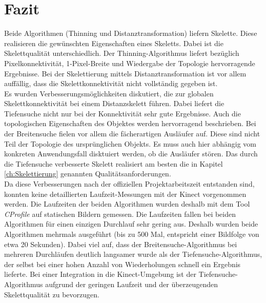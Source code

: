 \section{Fazit}
Beide Algorithmen (Thinning und Distanztransformation) liefern 
Skelette. Diese realisieren die gewünschten Eigenschaften eines
Skeletts. Dabei ist die Skelettqualität unterschiedlich. Der
Thinning-Algorithmus liefert bezüglich Pixelkonnektivität, 
1-Pixel-Breite und Wiedergabe der Topologie hervorragende Ergebnisse. Bei der Skelettierung mittels Distanztransformation
ist vor allem auffällig, dass die Skelettkonnektivität nicht vollständig gegeben ist. \\
Es wurden Verbesserungsmöglichkeiten diskutiert, die zur globalen Skelettkonnektivität bei einem Distanzskelett führen. Dabei
liefert die Tiefensuche nicht nur bei der Konnektivität sehr gute Ergebnisse. Auch die topologischen Eigenschaften des Objektes werden
hervorragend beschrieben. Bei der Breitensuche fielen vor allem die fächerartigen Ausläufer auf. Diese sind nicht Teil der Topologie
des ursprünglichen Objekts. Es muss auch hier abhängig vom konkreten Anwendungsfall disktuiert werden, ob die Ausläufer stören. Das durch die Tiefensuche verbesserte Skelett realisiert am besten die in Kapitel \ref{ch:Skelettierung} genannten Qualitätsanforderungen.\\ Da diese Verbesserungen nach der offiziellen Projektarbeitszeit entstanden sind, konnten keine detaillierten Laufzeit-Messungen mit der Kinect vorgenommen werden. Die Laufzeiten
der beiden Algorithmen wurden deshalb mit dem Tool \emph{CProfile} auf statischen Bildern gemessen. Die Laufzeiten fallen bei beiden Algorithmen für einen einzigen Durchlauf sehr gering aus. Deshalb wurden beide Algorithmen mehrmals ausgeführt (bis zu 500 Mal, entspricht einer Bildfolge von etwa 20 Sekunden). Dabei viel auf, dass der Breitensuche-Algorithmus bei mehreren Durchläufen deutlich langsamer wurde als der Tiefensuche-Algorithmus, der selbst bei einer hohen Anzahl von Wiederholungen schnell ein Ergebnis lieferte. Bei einer Integration in die
Kinect-Umgebung ist der Tiefensuche-Algorithmus aufgrund der geringen Laufzeit und der überzeugenden Skelettqualität zu bevorzugen. 